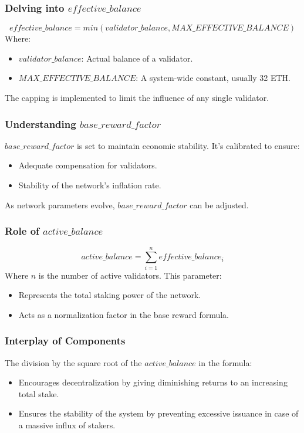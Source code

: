 \documentclass{beamer}
\begin{document}
\begin{frame}
    \frametitle{Delving into \(effective\_balance\)}
    \begin{equation*}
        effective\_balance = min\left(validator\_balance, MAX\_EFFECTIVE\_BALANCE\right)
    \end{equation*}
    Where:
    \begin{itemize}
        \item \(validator\_balance\): Actual balance of a validator.
        \item \(MAX\_EFFECTIVE\_BALANCE\): A system-wide constant, usually 32 ETH.
    \end{itemize}
    The capping is implemented to limit the influence of any single validator.
\end{frame}

\begin{frame}
    \frametitle{Understanding \(base\_reward\_factor\)}
    \(base\_reward\_factor\) is set to maintain economic stability. It's calibrated to ensure:
    \begin{itemize}
        \item Adequate compensation for validators.
        \item Stability of the network's inflation rate.
    \end{itemize}
    As network parameters evolve, \(base\_reward\_factor\) can be adjusted.
\end{frame}

\begin{frame}
    \frametitle{Role of \(active\_balance\)}
    \begin{equation*}
        active\_balance = \sum_{i=1}^{n} effective\_balance_i
    \end{equation*}
    Where \(n\) is the number of active validators. This parameter:
    \begin{itemize}
        \item Represents the total staking power of the network.
        \item Acts as a normalization factor in the base reward formula.
    \end{itemize}
\end{frame}

\begin{frame}
    \frametitle{Interplay of Components}
    The division by the square root of the \(active\_balance\) in the formula:
    \begin{itemize}
        \item Encourages decentralization by giving diminishing returns to an increasing total stake.
        \item Ensures the stability of the system by preventing excessive issuance in case of a massive influx of stakers.
    \end{itemize}
\end{frame}
\end{document}
